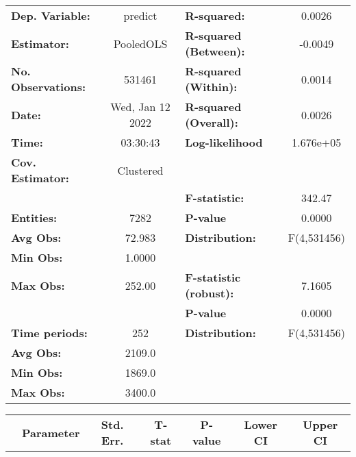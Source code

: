\begin{center}
\begin{tabular}{lclc}
\toprule
\textbf{Dep. Variable:}    &      predict       & \textbf{  R-squared:         }   &      0.0026      \\
\textbf{Estimator:}        &     PooledOLS      & \textbf{  R-squared (Between):}  &     -0.0049      \\
\textbf{No. Observations:} &       531461       & \textbf{  R-squared (Within):}   &      0.0014      \\
\textbf{Date:}             &  Wed, Jan 12 2022  & \textbf{  R-squared (Overall):}  &      0.0026      \\
\textbf{Time:}             &      03:30:43      & \textbf{  Log-likelihood     }   &    1.676e+05     \\
\textbf{Cov. Estimator:}   &     Clustered      & \textbf{                     }   &                  \\
\textbf{}                  &                    & \textbf{  F-statistic:       }   &      342.47      \\
\textbf{Entities:}         &        7282        & \textbf{  P-value            }   &      0.0000      \\
\textbf{Avg Obs:}          &       72.983       & \textbf{  Distribution:      }   &   F(4,531456)    \\
\textbf{Min Obs:}          &       1.0000       & \textbf{                     }   &                  \\
\textbf{Max Obs:}          &       252.00       & \textbf{  F-statistic (robust):} &      7.1605      \\
\textbf{}                  &                    & \textbf{  P-value            }   &      0.0000      \\
\textbf{Time periods:}     &        252         & \textbf{  Distribution:      }   &   F(4,531456)    \\
\textbf{Avg Obs:}          &       2109.0       & \textbf{                     }   &                  \\
\textbf{Min Obs:}          &       1869.0       & \textbf{                     }   &                  \\
\textbf{Max Obs:}          &       3400.0       & \textbf{                     }   &                  \\
\bottomrule
\end{tabular}
\begin{tabular}{lcccccc}
                & \textbf{Parameter} & \textbf{Std. Err.} & \textbf{T-stat} & \textbf{P-value} & \textbf{Lower CI} & \textbf{Upper CI}  \\

\end{tabular}
\end{center}
